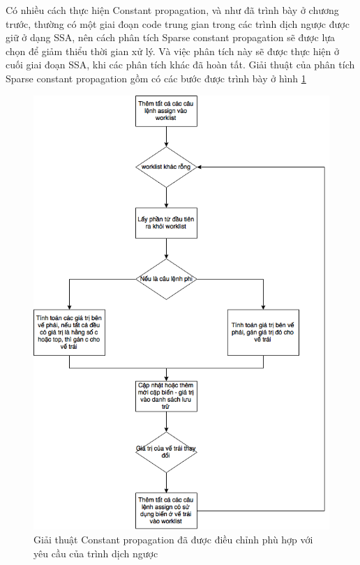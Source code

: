 Có nhiều cách thực hiện Constant propagation, và như đã trình bày ở chương trước, thường có một giai đoạn code trung gian trong các trình dịch ngược được giữ ở dạng SSA, nên cách phân tích Sparse constant propagation sẽ được lựa chọn để giảm thiểu thời gian xử lý. Và việc phân tích này sẽ được thực hiện ở cuối giai đoạn SSA, khi các phân tích khác đã hoàn tất. Giải thuật của phân tích Sparse constant propagation gồm có các bước được trình bày ở hình \ref{fig:constantpropagationalgo}

\begin{figure}
	\centering
	\includegraphics[scale=0.75]{image/constantPropagationAlgo}
	\caption{Giải thuật Constant propagation đã được điều chỉnh phù hợp với yêu cầu của trình dịch ngược}
	\label{fig:constantpropagationalgo}
\end{figure}

